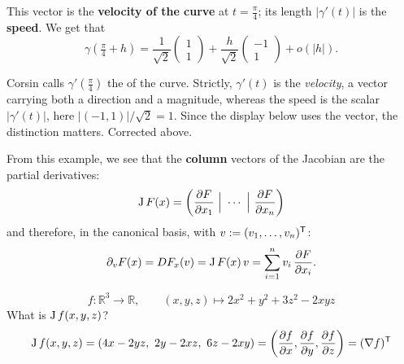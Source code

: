 This vector is the \textbf{velocity of the curve}  at
$t = \tfrac{\pi}{4}$; its length $|\gamma'(t)|$ is the \textbf{speed}. We get that
\[\gamma\!\left(\tfrac{\pi}{4}+h\right) = \frac{1}{\sqrt{2}}\begin{pmatrix}1\\1\end{pmatrix} + \frac{h}{\sqrt{2}}\begin{pmatrix}-1\\1\end{pmatrix} + o(|h|).\]

\begin{ainote}
Corsin calls $\gamma'(\tfrac{\pi}{4})$ the  of the curve. Strictly, $\gamma'(t)$ is the
\emph{velocity}, a vector carrying both a direction and a magnitude, whereas the speed is the
scalar $|\gamma'(t)|$, here $|(-1,1)|/\sqrt2 = 1$. Since the display below uses the vector, the
distinction matters. Corrected above.
\end{ainote}

From this example, we see that the \textbf{column} vectors of the Jacobian are the partial
derivatives:
\[\operatorname{J} F(x) = \left(\frac{\partial F}{\partial x_1}\ \Big|\ \cdots\ \Big|\ \frac{\partial F}{\partial x_n}\right)\]
and therefore, in the canonical basis, with $v := (v_1,\dots,v_n)^{\mathsf{T}}$:
\[\partial_v F(x) = DF_x(v) = \operatorname{J} F(x)\,v = \sum_{i=1}^{n} v_i\,\frac{\partial F}{\partial x_i}.\]

\begin{example}
\[f : \mathbb{R}^3\to\mathbb{R}, \qquad (x,y,z) \mapsto 2x^2 + y^2 + 3z^2 - 2xyz\]
What is $\operatorname{J} f(x,y,z)$?
\[\operatorname{J} f(x,y,z) = (4x - 2yz,\ 2y - 2xz,\ 6z - 2xy) = \left(\frac{\partial f}{\partial x}, \frac{\partial f}{\partial y}, \frac{\partial f}{\partial z}\right) = (\nabla f)^{\mathsf{T}}\]
\end{example}

